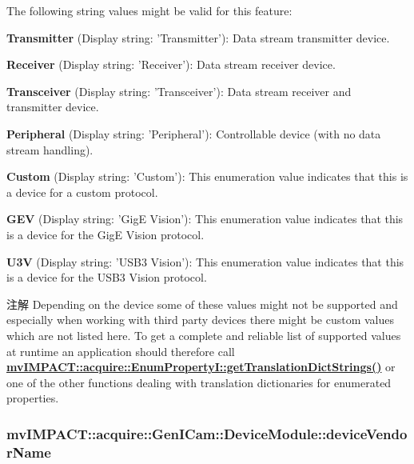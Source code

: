 The following string values might be valid for this feature\+:
\begin{DoxyItemize}
\item {\bfseries Transmitter} (Display string\+: 'Transmitter')\+: Data stream transmitter device.
\item {\bfseries Receiver} (Display string\+: 'Receiver')\+: Data stream receiver device.
\item {\bfseries Transceiver} (Display string\+: 'Transceiver')\+: Data stream receiver and transmitter device.
\item {\bfseries Peripheral} (Display string\+: 'Peripheral')\+: Controllable device (with no data stream handling).
\item {\bfseries Custom} (Display string\+: 'Custom')\+: This enumeration value indicates that this is a device for a custom protocol.
\item {\bfseries G\+E\+V} (Display string\+: 'Gig\+E Vision')\+: This enumeration value indicates that this is a device for the Gig\+E Vision protocol.
\item {\bfseries U3\+V} (Display string\+: 'U\+S\+B3 Vision')\+: This enumeration value indicates that this is a device for the U\+S\+B3 Vision protocol.
\end{DoxyItemize}

\begin{DoxyNote}{注解}
Depending on the device some of these values might not be supported and especially when working with third party devices there might be custom values which are not listed here. To get a complete and reliable list of supported values at runtime an application should therefore call {\bfseries \hyperlink{classmv_i_m_p_a_c_t_1_1acquire_1_1_enum_property_i_a0ba6ccbf5ee69784d5d0b537924d26b6}{mv\+I\+M\+P\+A\+C\+T\+::acquire\+::\+Enum\+Property\+I\+::get\+Translation\+Dict\+Strings()}} or one of the other functions dealing with translation dictionaries for enumerated properties. 
\end{DoxyNote}
\hypertarget{classmv_i_m_p_a_c_t_1_1acquire_1_1_gen_i_cam_1_1_device_module_ac4eb3b74a5fec7c810024da6d0a78d4c}{
\subsubsection[{device\+Vendor\+Name}]{ mv\+I\+M\+P\+A\+C\+T\+::acquire\+::\+Gen\+I\+Cam\+::\+Device\+Module\+::device\+Vendor\+Name}}\label{classmv_i_m_p_a_c_t_1_1acquire_1_1_gen_i_cam_1_1_device_module_ac4eb3b74a5fec7c810024da6d0a78d4c}



